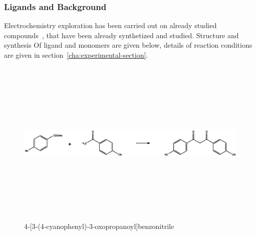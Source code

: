 \documentclass[../Master.tex]{subfiles}
\begin{document}
\subsubsection{Ligands and  Background}
Electrochemistry exploration has been carried out on already studied compounds\ \cite{carlucci_heterometallic_2010}, that have been already synthetized and studied. Structure and synthesis Of ligand and monomers  are given below, details of reaction conditions are given in section\ \ref{cha:experimental-section}.
\begin{figure}[h!]
	\centering
	\includegraphics[width=16cm,height=8cm,keepaspectratio]{Structures/dicn-sint.eps}\caption{ 4‐[3‐(4‐cyanophenyl)‐3‐oxopropanoyl]benzonitrile}\label{fig:pyrazole-retro-alt}
\end{figure}
\end{document}
